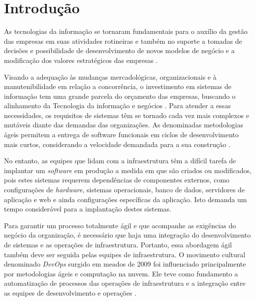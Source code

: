 \section{\esp Introdução}

As tecnologias da informação se tornaram fundamentais para o auxílio da gestão das empresas em suas atividades rotineiras e também no suporte a tomadas de decisões e possibilidade de desenvolvimento de novos modelos de negócio e a modificação dos valores estratégicos das empresas \cite{audy}.

Visando a adequação às mudanças mercadológicas, organizacionais e à manutenibilidade em relação a concorrência, o investimento em sistemas de informação tem uma grande parcela do orçamento das empresas, buscando o alinhamento da Tecnologia da informação e negócios \cite{luftman}.  
Para atender a essas necessidades, os requisitos de sistemas têm se tornado cada vez mais complexos e mutáveis diante das demandas das organizações. As denominadas metodologias ágeis permitem a entrega de software funcionais em ciclos de desenvolvimento mais curtos, considerando a velocidade demandada para a sua construção \cite{sbbrocco}. 
          
No entanto, as equipes que lidam com a infraestrutura têm a difícil tarefa de implantar um \textit{software} em produção a medida em que são criados ou modificados, pois estes sistemas requerem dependências de componentes externos, como configurações de \textit{hardware}, sistemas operacionais, banco de dados, servidores de aplicação e web e ainda configurações específicas da aplicação. Isto demanda um tempo considerável para a implantação destes sistemas\cite{sato}.

Para garantir um processo totalmente ágil e que acompanhe as exigências do negócio da organização, é necessário que haja uma integração do desenvolvimento de sistemas e as operações de infraestrutura. Portanto, essa abordagem ágil também deve ser seguida pelas equipes de infraestrutura. O movimento cultural denominado \textit{DevOps} surgido em meados de 2009 foi influenciado principalmente por metodologias ágeis e computação na nuvem. Ele teve como fundamento a automatização de processos das operações de infraestrutura e a integração entre as equipes de desenvolvimento e operações  \cite{sato}.

